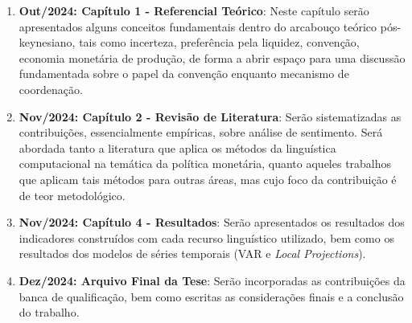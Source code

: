 \begin{enumerate}

\item \textbf{Out/2024: Capítulo 1 - Referencial Teórico}: Neste capítulo serão apresentados alguns conceitos fundamentais dentro do arcabouço teórico pós-keynesiano, tais como incerteza, preferência pela liquidez, convenção, economia monetária de produção, de forma a abrir espaço para uma discussão fundamentada sobre o papel da convenção enquanto mecanismo de coordenação.
\bigskip
\item \textbf{Nov/2024: Capítulo 2 - Revisão de Literatura}: Serão sistematizadas as contribuições, essencialmente empíricas, sobre análise de sentimento. Será abordada tanto a literatura que aplica os métodos da linguística computacional na temática da política monetária, quanto aqueles trabalhos que aplicam tais métodos para outras áreas, mas cujo foco da contribuição é de teor metodológico. 
\bigskip
\item \textbf{Nov/2024: Capítulo 4 - Resultados}: Serão apresentados os resultados dos indicadores construídos com cada recurso linguístico utilizado, bem como os resultados dos modelos de séries temporais (VAR e \textit{Local Projections}). 
\bigskip
\item \textbf{Dez/2024: Arquivo Final da Tese}: Serão incorporadas as contribuições da banca de qualificação, bem como escritas as considerações finais e a conclusão do trabalho.


\end{enumerate}